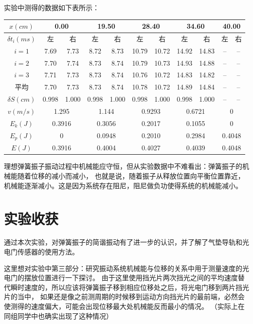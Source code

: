 \documentclass{article}
\begin{document}
    实验中测得的数据如下表所示：

    \begin{center}
        \begin{tabular}{|c|c|c|c|c|c|c|c|c|c|c|}
            \hline
            $x(cm)$ & \multicolumn{2}{|c|}{0.00} & \multicolumn{2}{|c|}{19.50} & \multicolumn{2}{|c|}{28.40} & \multicolumn{2}{|c|}{34.60} & \multicolumn{2}{|c|}{40.00}\\
            \hline
            $\delta t_i(ms)$ & 左 & 右 & 左 & 右 & 左 & 右 & 左 & 右 & 左 & 右\\
            \hline
            $i=1$ & 7.69 & 7.73 & 8.72 & 8.73 & 10.79 & 10.72 & 14.92 & 14.83 & -- & --\\
            \hline
            $i=2$ & 7.70 & 7.74 & 8.73 & 8.74 & 10.79 & 10.73 & 14.93 & 14.88 & -- & --\\
            \hline
            $i=3$ & 7.71 & 7.73 & 8.73 & 8.74 & 10.76 & 10.72 & 14.83 & 14.82 & -- & --\\
            \hline
            平均 & 7.70 & 7.73 & 8.73 & 8.74 & 10.78 & 10.72 & 14.89 & 14.84 & -- & --\\
            \hline
            $\delta S(cm)$ & 0.998 & 1.000 & 0.998 & 1.000 & 0.998 & 1.000 & 0.998 & 1.000 & -- & --\\
            \hline
            $v(m/s)$ & \multicolumn{2}{|c|}{1.295} & \multicolumn{2}{|c|}{1.144} & \multicolumn{2}{|c|}{0.9293} & \multicolumn{2}{|c|}{0.6721} &  \multicolumn{2}{|c|}{0}\\
            \hline
            $E_k(J)$ & \multicolumn{2}{|c|}{0.3916} & \multicolumn{2}{|c|}{0.3056} & \multicolumn{2}{|c|}{0.2017} & \multicolumn{2}{|c|}{0.1055} &  \multicolumn{2}{|c|}{0}\\
            \hline
            $E_p(J)$ & \multicolumn{2}{|c|}{0} & \multicolumn{2}{|c|}{0.0948} & \multicolumn{2}{|c|}{0.2010} & \multicolumn{2}{|c|}{0.2984} &  \multicolumn{2}{|c|}{0.4048}\\
            \hline
            $E(J)$ & \multicolumn{2}{|c|}{0.3916} & \multicolumn{2}{|c|}{0.4004} & \multicolumn{2}{|c|}{0.4027} & \multicolumn{2}{|c|}{0.4039} &  \multicolumn{2}{|c|}{0.4048}\\
            \hline
        \end{tabular}
    \end{center}

    理想弹簧振子振动过程中机械能应守恒，但从实验数据中不难看出：弹簧振子的机械能随着位移的减小而减小，
    也就是说，随着振子从释放位置向平衡位置靠近，机械能逐渐减小。这是因为系统存在阻尼，阻尼做负功使得系统的机械能减小。

    \section{实验收获}
    通过本次实验，对弹簧振子的简谐振动有了进一步的认识，并了解了气垫导轨和光电门传感器的使用方法。
    
    这里想对实验中第三部分：研究振动系统机械能与位移的关系中用于测量速度的光电门的摆放位置进行一下探讨。
    由于这里使用挡光片两次挡光之间的平均速度替代瞬时速度的，所以应该将弹簧振子移到相应位移处之后，将光电门移到两片挡光片的当中，
    如果还是像之前测周期的时候移到运动方向挡光片的最前端，必然会使测得的速度偏大，可能会出现位移最大处机械能反而最小的情况。
    （实际上在同组同学中也确实出现了这种情况）
\end{document}
